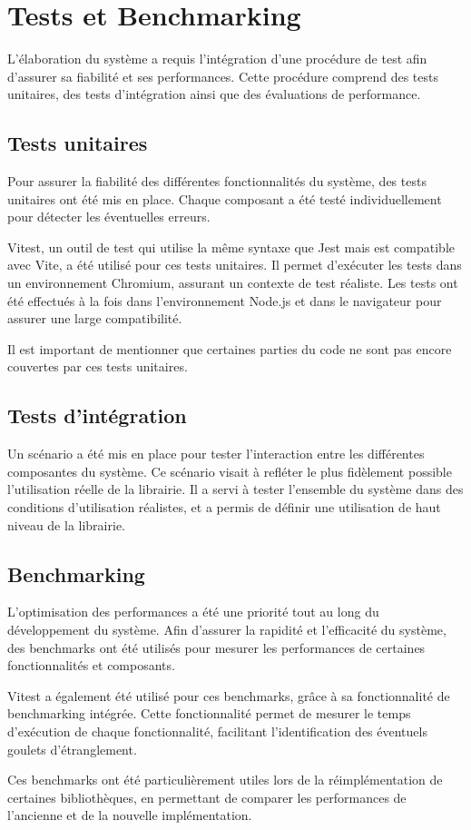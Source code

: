 \section{Tests et Benchmarking}

L'élaboration du système a requis l'intégration d'une procédure de test afin d'assurer sa fiabilité et ses performances. Cette procédure comprend des tests unitaires, des tests d'intégration ainsi que des évaluations de performance.

\subsection{Tests unitaires}

Pour assurer la fiabilité des différentes fonctionnalités du système, des tests unitaires ont été mis en place. Chaque composant a été testé individuellement pour détecter les éventuelles erreurs.

Vitest, un outil de test qui utilise la même syntaxe que Jest mais est compatible avec Vite, a été utilisé pour ces tests unitaires. Il permet d'exécuter les tests dans un environnement Chromium, assurant un contexte de test réaliste. Les tests ont été effectués à la fois dans l'environnement \gls{Node.js} et dans le navigateur pour assurer une large compatibilité.

Il est important de mentionner que certaines parties du code ne sont pas encore couvertes par ces tests unitaires.

\subsection{Tests d'intégration}

Un scénario a été mis en place pour tester l'interaction entre les différentes composantes du système. Ce scénario visait à refléter le plus fidèlement possible l'utilisation réelle de la librairie. Il a servi à tester l'ensemble du système dans des conditions d'utilisation réalistes, et a permis de définir une utilisation de haut niveau de la librairie.

\subsection{Benchmarking}

L'optimisation des performances a été une priorité tout au long du développement du système. Afin d'assurer la rapidité et l'efficacité du système, des benchmarks ont été utilisés pour mesurer les performances de certaines fonctionnalités et composants.

Vitest a également été utilisé pour ces benchmarks, grâce à sa fonctionnalité de benchmarking intégrée. Cette fonctionnalité permet de mesurer le temps d'exécution de chaque fonctionnalité, facilitant l'identification des éventuels goulets d'étranglement.

Ces benchmarks ont été particulièrement utiles lors de la réimplémentation de certaines bibliothèques, en permettant de comparer les performances de l'ancienne et de la nouvelle implémentation.